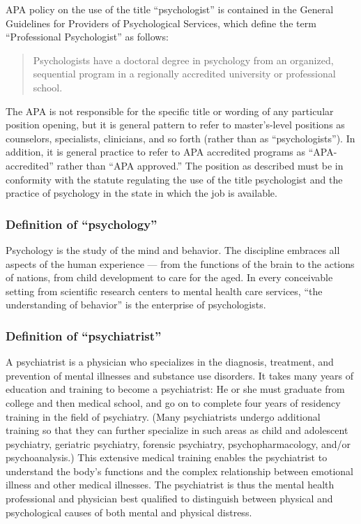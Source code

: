 APA policy on the use of the title ``psychologist'' is contained in the General Guidelines for Providers of Psychological Services, which define the term ``Professional Psychologist'' as follows:

\begin{quote}

Psychologists have a doctoral degree in psychology from an organized, sequential program in a regionally accredited university or professional school.
\end{quote}

The APA is not responsible for the specific title or wording of any particular position opening, but it is general pattern to refer to master's-level positions as counselors, specialists, clinicians, and so forth (rather than as ``psychologists''). In addition, it is general practice to refer to APA accredited programs as ``APA-accredited'' rather than ``APA approved.'' The position as described must be in conformity with the statute regulating the use of the title psychologist and the practice of psychology in the state in which the job is available.

\subsubsection{Definition of ``psychology''}
\label{definitionofpsychology}

Psychology is the study of the mind and behavior. The discipline embraces all aspects of the human experience --- from the functions of the brain to the actions of nations, from child development to care for the aged. In every conceivable setting from scientific research centers to mental health care services, ``the understanding of behavior'' is the enterprise of psychologists.

\subsubsection{Definition of ``psychiatrist''}
\label{definitionofpsychiatrist}

A psychiatrist is a physician who specializes in the diagnosis, treatment, and prevention of mental illnesses and substance use disorders. It takes many years of education and training to become a psychiatrist: He or she must graduate from college and then medical school, and go on to complete four years of residency training in the field of psychiatry. (Many psychiatrists undergo additional training so that they can further specialize in such areas as child and adolescent psychiatry, geriatric psychiatry, forensic psychiatry, psychopharmacology, and\slash or psychoanalysis.) This extensive medical training enables the psychiatrist to understand the body's functions and the complex relationship between emotional illness and other medical illnesses. The psychiatrist is thus the mental health professional and physician best qualified to distinguish between physical and psychological causes of both mental and physical distress.


